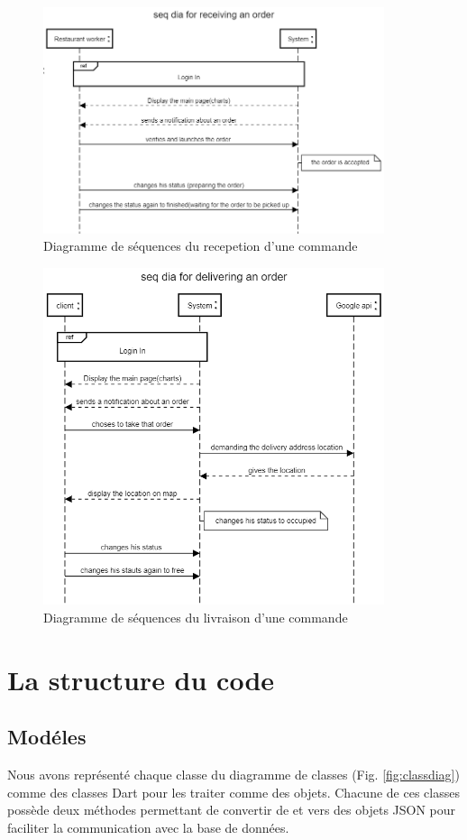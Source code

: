 \documentclass[french, a4paper, french]{report}
\begin{document}
			\begin{figure}[!h]
  				\center
  				\includegraphics[width=10cm]{seqrest.png}
  				\caption{Diagramme de séquences du recepetion d'une commande}
  				\label{fig:seqrest}
			\end{figure}
			\begin{figure}[!h]
  				\center
  				\includegraphics[width=10cm]{seqdeliver.png}
  				\caption{Diagramme de séquences du livraison d'une commande}
  				\label{fig:seqdeliver}
			\end{figure}
			
	\section{La structure du code}
		\subsection{Modéles} Nous avons représenté chaque classe du diagramme de classes (Fig. \ref{fig:classdiag}) comme des classes Dart pour les traiter comme des objets. Chacune de ces classes possède deux méthodes permettant de convertir de et vers des objets JSON  pour faciliter la communication avec la base de données.
\end{document}
